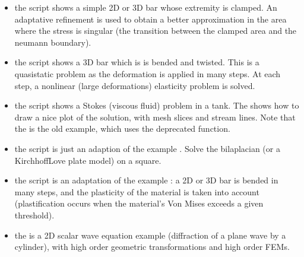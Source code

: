 \documentclass[a4paper,11pt,english]{sphinxmanual}
\begin{document}
\label{\detokenize{matlab_octave/examples:other-examples}}\begin{itemize}
\item {} 
\sphinxAtStartPar
the  script shows a simple 2D or 3D bar whose extremity is
clamped. An adaptative refinement is used to obtain a better approximation in
the area where the stress is singular (the transition between the clamped area
and the neumann boundary).

\item {} 
\sphinxAtStartPar
the  script shows a 3D bar which is is
bended and twisted. This is a quasi\sphinxhyphen{}static problem as the deformation is
applied in many steps. At each step, a non\sphinxhyphen{}linear (large deformations)
elasticity problem is solved.

\item {} 
\sphinxAtStartPar
the  script shows a Stokes (viscous fluid) problem
in a tank. The  shows how to draw a nice plot
of the solution, with mesh slices and stream lines. Note that the
 is the old example, which uses the deprecated
 function.

\item {} 
\sphinxAtStartPar
the  script is just an adaption of the  example
. Solve the bilaplacian (or a Kirchhoff\sphinxhyphen{}Love plate
model) on a square.

\item {} 
\sphinxAtStartPar
the  script is an adaptation of the  example
: a 2D or 3D bar is bended in many steps, and the
plasticity of the material is taken into account (plastification occurs when
the material’s Von Mises exceeds a given threshold).

\item {} 
\sphinxAtStartPar
the  is a 2D scalar wave equation example (diffraction of
a plane wave by a cylinder), with high order geometric transformations and high
order FEMs.

\end{itemize}
\end{document}
